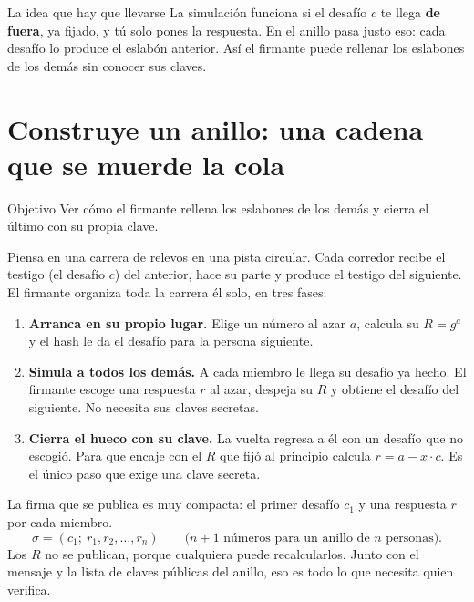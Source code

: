 \documentclass[11pt,a4paper]{article}
\theoremstyle{definition}
\theoremstyle{plain}
\theoremstyle{remark}
\begin{document}
\begin{clave}{La idea que hay que llevarse}
La simulación funciona si el desafío $c$ te llega \textbf{de fuera}, ya fijado, y tú
solo pones la respuesta. En el anillo pasa justo eso: cada desafío lo produce el
eslabón anterior. Así el firmante puede rellenar los eslabones de los demás sin
conocer sus claves.
\end{clave}

\section{Construye un anillo: una cadena que se muerde la cola}\label{sec:anillo}

\begin{nota}{Objetivo}
Ver cómo el firmante rellena los eslabones de los demás y cierra el último con su
propia clave.
\end{nota}

Piensa en una carrera de relevos en una pista circular. Cada corredor recibe el
testigo (el desafío $c$) del anterior, hace su parte y produce el testigo del
siguiente. El firmante organiza toda la carrera él solo, en tres fases:

\begin{enumerate}[leftmargin=2em,itemsep=0.4em,label=\textbf{\arabic*.}]
  \item \textbf{Arranca en su propio lugar.} Elige un número al azar $a$, calcula su
    $R = g^{a}$ y el hash le da el desafío para la persona siguiente.
  \item \textbf{Simula a todos los demás.} A cada miembro le llega su desafío ya
    hecho. El firmante escoge una respuesta $r$ al azar, despeja su $R$ y obtiene el
    desafío del siguiente. No necesita sus claves secretas.
  \item \textbf{Cierra el hueco con su clave.} La vuelta regresa a él con un desafío
    que no escogió. Para que encaje con el $R$ que fijó al principio calcula
    $r = a - x\cdot c$. Es el único paso que exige una clave secreta.
\end{enumerate}

La firma que se publica es muy compacta: el primer desafío $c_1$ y una respuesta
$r$ por cada miembro.
\begin{equation}\label{eq:sigma}
  \sigma = (c_1;\ r_1, r_2, \dots, r_n)
  \qquad\text{($n+1$ números para un anillo de $n$ personas).}
\end{equation}
Los $R$ no se publican, porque cualquiera puede recalcularlos. Junto con el mensaje
y la lista de claves públicas del anillo, eso es todo lo que necesita quien verifica.
\end{document}
